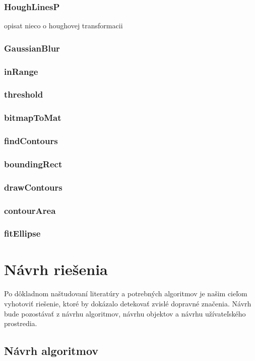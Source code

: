\documentclass[12pt]{article}
\begin{document}
\subsubsection{HoughLinesP}
opisat nieco o houghovej transformacii
\subsubsection{GaussianBlur}
\subsubsection{inRange}
\subsubsection{threshold}
\subsubsection{bitmapToMat}
\subsubsection{findContours}
\subsubsection{boundingRect}
\subsubsection{drawContours}
\subsubsection{contourArea}
\subsubsection{fitEllipse}

\section{Návrh riešenia}
\paragraph{}
Po dôkladnom naštudovaní literatúry a potrebných algoritmov je našim cieľom vyhotoviť riešenie, ktoré by dokázalo detekovať zvislé dopravné značenia.
Návrh bude pozostávať z návrhu algoritmov, návrhu objektov a návrhu užívateľského prostredia.
\subsection{Návrh algoritmov}
\end{document}
